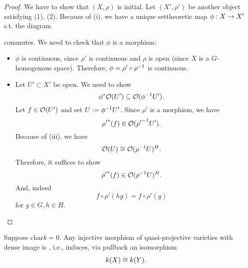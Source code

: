 \begin{proof}
	We have to show that $(X,\rho)$ is initial. Let $(X', \rho')$ be another object satisfying (1), (2).
	Because of (i), we have a unique settheoretic map $\phi : X \overset{}{\rightarrow} X'$ s.t. the diagram
	\begin{center}
	\end{center}
commutes. We need to check that $\phi$ is a morphism:
\begin{itemize}
	\item $\phi$ is continuous, since $\rho'$ is continuous and $\rho$ is open (since $X$ is a $G$-homogenous space). Therefore, $\phi = \rho' \circ \rho^{-1}$ is continuous.
	\item Let $U' \subset X'$ be open. We need to show
	\[ \phi^* \mathcal{O}(U') \subseteq \mathcal{O}(\phi^{-1} U'). \]
	Let $f \in \mathcal{O}(U')$ and set $U := \phi^{-1} U'$. Since $\rho'$ is a morphism, we have
	\[ {\rho'}^*(f) \in \mathcal{O}({\rho'}^{-1} U'). \]
	Because of (iii), we have
	\[ \mathcal{O}(U) \overset{}{\cong} \mathcal{O}(\rho^{-1} U)^H. \]
	Therefore, it suffices to show
	\[ {\rho'}^*(f) \in \mathcal{O}(\rho^{-1} U)^H. \]
	And, indeed
	\[ f \circ \rho'(hg) = f \circ \rho'(g) \]
	for $g \in G, h \in H$.
\end{itemize}
\end{proof}

\begin{lemma}
	Suppose $\mathrm{char} k = 0$. Any injective morphism of quasi-projective varieties with dense image is , i.e., induces, via pullback an isomorphism
	\[ k(X) \overset{}{\cong} k(Y). \]
\end{lemma}

